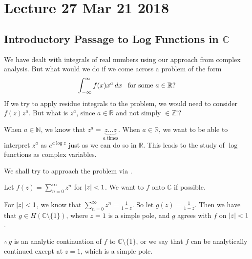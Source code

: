 \documentclass[notoc,notitlepage]{tufte-book}
\begin{document}



\chapter{Lecture 27 Mar 21 2018}
  \label{chapter:lecture_27_mar_21_2018}

\section{Introductory Passage to Log Functions in \texorpdfstring{$\mathbb{C}$}{C}} %
\label{sec:introductory_passage_to_log_functions_in_c}

We have dealt with integrals of real numbers using our approach from complex analysis. But what would we do if we come across a problem of the form
\begin{equation*}
  \int_{-\infty}^{\infty} f(x) x^a \mathop{}\!d{x} \enspace \text{ for some } a \in \mathbb{R}?
\end{equation*}
If we try to apply residue integrals to the problem, we would need to consider $f(z) z^a$. But what is $z^a$, since $a \in \mathbb{R}$ and not simply $\in \mathbb{Z}$!?

When $a \in \mathbb{N}$, we know that $z^a = \underbrace{z \hdots z}_{a \text{ times}}$. When $a \in \mathbb{R}$, we want to be able to interpret $z^a$ as $e^{a \log z}$ just as we can do so in $\mathbb{R}$. This leads to the study of $\log$ functions as complex variables.

We shall try to approach the problem via .

\begin{ex}
  Let $f(z) = \sum_{n=0}^{\infty} z^n$ for $\left|z\right| < 1$. We want to  $f$ onto $\mathbb{C}$ if possible.

  For $\left|z\right| < 1$, we know that $\sum_{n=0}^{\infty} z^n = \frac{1}{1 - z}$. So let $g(z) = \frac{1}{1 - z}$. Then we have that $g \in H(\mathbb{C} \setminus \{1\} )$, where $z = 1$ is a simple pole, and $g$ agrees with $f$ on $\left|z\right| < 1$.

  $\therefore \, g$ is an analytic continuation of $f$ to $\mathbb{C} \setminus \{1\}$, or we say that $f$ can be analytically continued except at $z = 1$, which is a simple pole.
\end{ex}
\end{document}
